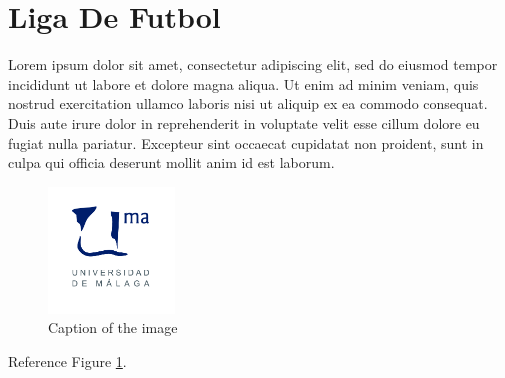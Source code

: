 \documentclass{article}
\begin{document}
\section{Liga De Futbol}

Lorem ipsum dolor sit amet, consectetur adipiscing elit, sed do eiusmod tempor incididunt ut labore et dolore magna aliqua. Ut enim ad minim veniam, quis nostrud exercitation ullamco laboris nisi ut aliquip ex ea commodo consequat. Duis aute irure dolor in reprehenderit in voluptate velit esse cillum dolore eu fugiat nulla pariatur. Excepteur sint occaecat cupidatat non proident, sunt in culpa qui officia deserunt mollit anim id est laborum.

\begin{figure}
	\centering
	\includegraphics[width=0.30\textwidth]{images/uma_logo.jpg}
	\caption{Caption of the image}
	\label{fig:example1}
\end{figure}

Reference Figure \ref{fig:example1}.

\cite{oracle2024}
\cite{sqlserver2022}

\end{document}
